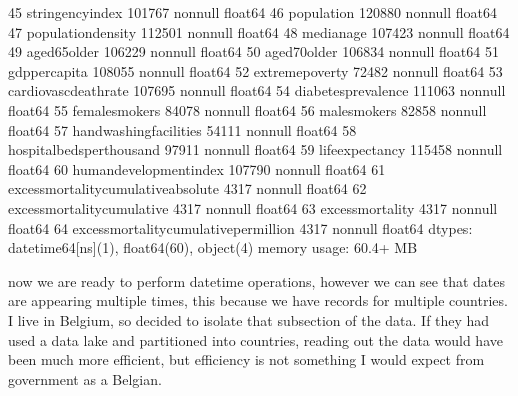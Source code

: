 \documentclass[letterpaper,10pt,english]{jupyterBook}
\begin{document}
\begin{sphinxVerbatim}[commandchars=\\\{\}]
 45  stringency\PYGZus{}index                         101767 non\PYGZhy{}null  float64       
 46  population                               120880 non\PYGZhy{}null  float64       
 47  population\PYGZus{}density                       112501 non\PYGZhy{}null  float64       
 48  median\PYGZus{}age                               107423 non\PYGZhy{}null  float64       
 49  aged\PYGZus{}65\PYGZus{}older                            106229 non\PYGZhy{}null  float64       
 50  aged\PYGZus{}70\PYGZus{}older                            106834 non\PYGZhy{}null  float64       
 51  gdp\PYGZus{}per\PYGZus{}capita                           108055 non\PYGZhy{}null  float64       
 52  extreme\PYGZus{}poverty                          72482 non\PYGZhy{}null   float64       
 53  cardiovasc\PYGZus{}death\PYGZus{}rate                    107695 non\PYGZhy{}null  float64       
 54  diabetes\PYGZus{}prevalence                      111063 non\PYGZhy{}null  float64       
 55  female\PYGZus{}smokers                           84078 non\PYGZhy{}null   float64       
 56  male\PYGZus{}smokers                             82858 non\PYGZhy{}null   float64       
 57  handwashing\PYGZus{}facilities                   54111 non\PYGZhy{}null   float64       
 58  hospital\PYGZus{}beds\PYGZus{}per\PYGZus{}thousand               97911 non\PYGZhy{}null   float64       
 59  life\PYGZus{}expectancy                          115458 non\PYGZhy{}null  float64       
 60  human\PYGZus{}development\PYGZus{}index                  107790 non\PYGZhy{}null  float64       
 61  excess\PYGZus{}mortality\PYGZus{}cumulative\PYGZus{}absolute     4317 non\PYGZhy{}null    float64       
 62  excess\PYGZus{}mortality\PYGZus{}cumulative              4317 non\PYGZhy{}null    float64       
 63  excess\PYGZus{}mortality                         4317 non\PYGZhy{}null    float64       
 64  excess\PYGZus{}mortality\PYGZus{}cumulative\PYGZus{}per\PYGZus{}million  4317 non\PYGZhy{}null    float64       
dtypes: datetime64[ns](1), float64(60), object(4)
memory usage: 60.4+ MB
\end{sphinxVerbatim}

\sphinxAtStartPar
now we are ready to perform datetime operations, however we can see that dates are appearing multiple times, this because we have records for multiple countries.
I live in Belgium, so decided to isolate that subsection of the data.
If they had used a data lake and partitioned into countries, reading out the data would have been much more efficient, but efficiency is not something I would expect from government as a Belgian.
\end{document}
